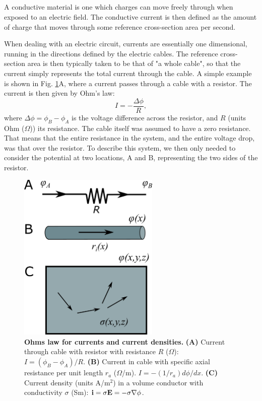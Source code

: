 \subsection{}
A conductive material   is one which charges can move freely through when exposed to an electric field. The conductive current is then defined as the amount of charge that moves through some reference cross-section area per second. 

When dealing with an electric circuit, currents are essentially one dimensional, running in the directions defined by the electric cables. The reference cross-section area is then typically taken to be that of "a whole cable", so that the current simply represents the total current through the cable. A simple example is shown in Fig. \ref{fig:Basics:Currents}A, where a current passes through a cable with a resistor. The current is then given by Ohm's law:
\begin{equation}
I = - \frac{\Delta \phi}{R}, 
\label{eq:Basics:Ohm_R}
\end{equation}
where $\Delta \phi = \phi_B-\phi_A$ is the voltage difference across the resistor, and $R$ (units Ohm ($\Omega$)) its resistance. The cable itself was assumed to have a zero resistance. That means that the entire resistance in the system, and the entire voltage drop, was that over the resistor. To describe this system, we then only needed to consider the potential at two locations, A and B, representing the two sides of the resistor. 

\begin{figure}[!ht]
\begin{center}
\includegraphics[width=0.6\textwidth]{Figures/Basics/Currents.png}
\end{center}
\caption{{\bf Ohms law for currents and current densities.} {\bf (A)} Current through cable with resistor with resistance $R$ ($\Omega$): $I = (\phi_B-\phi_A)/R$. {\bf (B)} Current in cable with specific axial resistance per unit length $r_a$ ($\Omega$/m).  $I=- (1/r_a) d\phi/dx$. {\bf (C)} Current density (units A/m$^2$) in a volume conductor with conductivity $\sigma$ (Sm): ${\bf i} = \sigma {\bf E} = - \sigma \nabla \phi$.}
\label{fig:Basics:Currents}
\end{figure}

